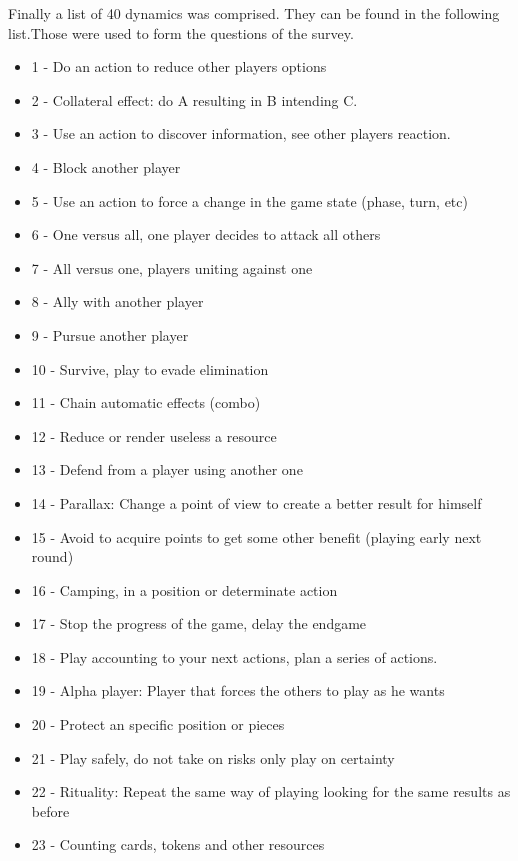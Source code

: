 Finally a list of 40 dynamics was comprised. They can be found in the following list.Those were used to form the questions of the survey. 
\begin{multicols}{2}
\begin{itemize}
    \item 1 - Do an action to reduce other players options
    \item 2 - Collateral effect: do A resulting in B intending C.
    \item 3 - Use an action to discover information, see other players reaction.
    \item 4 - Block another player
    \item 5 - Use an action to force a change in the game state (phase, turn, etc)
    \item 6 - One versus all, one player decides to attack all others
    \item 7 - All versus one, players uniting against one
    \item 8 - Ally with another player
    \item 9 - Pursue another player
    \item 10 - Survive, play to evade elimination
    \item 11 - Chain automatic effects (combo)
    \item 12 - Reduce or render useless a resource
    \item 13 - Defend from a player using another one
    \item 14 - Parallax: Change a point of view to create a better result for himself
    \item 15 - Avoid to acquire points to get some other benefit (playing early next round)
    \item 16 - Camping, in a position or determinate action
    \item 17 - Stop the progress of the game, delay the endgame
    \item 18 - Play accounting to your next actions, plan a series of actions.
    \item 19 - Alpha player: Player that forces the others to play as he wants
    \item 20 - Protect an specific position or pieces
    \item 21 - Play safely, do not take on risks only play on certainty
    \item 22 - Rituality: Repeat the same way of playing looking for the same results as before
    \item 23 - Counting cards, tokens and other resources

\end{itemize}
\end{multicols}
